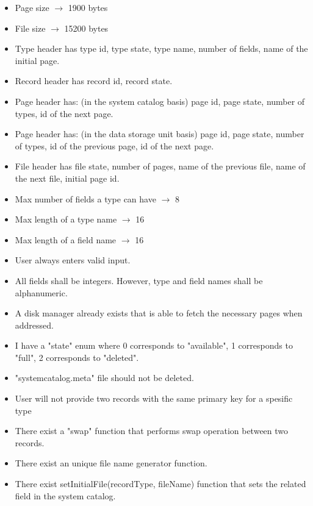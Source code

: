 \documentclass{article}
\begin{document}
\begin{itemize}
    \item Page size $\rightarrow$ 1900 bytes
    \item File size $\rightarrow$ 15200 bytes
    \item Type header has type id, type state, type name, number of fields, name of the initial page.
    \item Record header has record id, record state.
    \item Page header has: (in the system catalog basis) page id, page state, number of types, id of the next page.
    \item Page header has: (in the data storage unit basis) page id, page state, number of types, id of the previous page, id of the next page.
    \item File header has file state, number of pages, name of the previous file, name of the next file, initial page id.
    \item Max number of fields a type can have $\rightarrow$ 8
    \item Max length of a type name $\rightarrow$ 16
    \item Max length of a field name $\rightarrow$ 16
    \item User always enters valid input.
    \item All fields shall be integers.  However, type and field names shall be alphanumeric.
    \item A disk manager already exists that is able to fetch the necessary pages when addressed.
    \item I have a "state" enum where 0 corresponds to "available", 1 corresponds to "full", 2 corresponds to "deleted".
    \item "systemcatalog.meta" file should not be deleted.
    \item User will not provide two records with the same primary key for a spesific type
    \item There exist a "swap" function that performs swap operation between two records.
    \item There exist an unique file name generator function.
    \item There exist setInitialFile(recordType, fileName) function that sets the related field in the system catalog.
\end{itemize}
\end{document}
